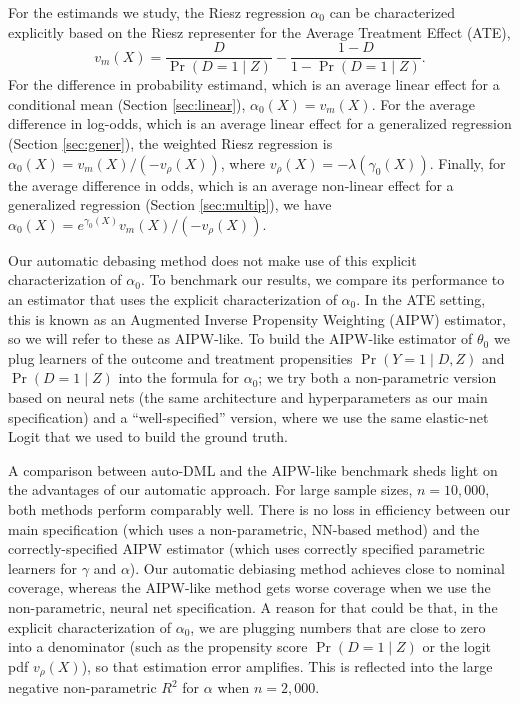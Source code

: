 \documentclass[aos]{imsart}
\numberwithin{equation}{section}
\theoremstyle{plain}
\theoremstyle{remark}
\begin{document}
For the estimands we study, the Riesz regression $\alpha_0$ can be characterized explicitly based on the Riesz representer for the Average Treatment Effect (ATE),
\[v_m(X) = \frac{D}{\Pr(D = 1 \mid Z)} - \frac{1-D}{1 - \Pr(D = 1 \mid Z)}.\]
For the difference in probability estimand, which is an average linear effect for a conditional mean (Section \ref{sec:linear}), $\alpha_0(X) = v_m(X)$. For the average difference in log-odds, which is an average linear effect for a generalized regression (Section \ref{sec:gener}), the weighted Riesz regression is $\alpha_0(X) = v_m(X)/(-v_\rho(X))$, where $v_\rho(X) = -\lambda(\gamma_0(X))$. Finally, for the average difference in odds, which is an average non-linear effect for a generalized regression (Section \ref{sec:multip}), we have $\alpha_0(X) = e^{\gamma_0(X)}v_m(X)/(-v_\rho(X))$. 

Our automatic debasing method does not make use of this explicit characterization of $\alpha_0$. To benchmark our results, we compare its performance to an estimator that uses the explicit characterization of $\alpha_0$. In the ATE setting, this is known as an Augmented Inverse Propensity Weighting (AIPW) estimator, so we will refer to these as AIPW-like. To build the AIPW-like estimator of $\theta_0$ we plug learners of the outcome and treatment propensities $\Pr(Y = 1 \mid D, Z)$ and $\Pr(D = 1 \mid Z)$ into the formula for $\alpha_0$; we try both a non-parametric version based on neural nets (the same architecture and hyperparameters as our main specification) and a ``well-specified'' version, where we use the same elastic-net Logit that we used to build the ground truth.

A comparison between auto-DML and the AIPW-like benchmark sheds light on the advantages of our automatic approach. For large sample sizes, $n = 10,000$, both methods perform comparably well. There is no loss in efficiency between our main specification (which uses a non-parametric, NN-based method) and the correctly-specified AIPW estimator (which uses correctly specified parametric learners for $\gamma$ and $\alpha$). Our automatic debiasing method achieves close to nominal coverage, whereas the AIPW-like method gets worse coverage when we use the non-parametric, neural net specification. A reason for that could be that, in the explicit characterization of $\alpha_0$, we are plugging numbers that are close to zero into a denominator (such as the propensity score $\Pr(D = 1 \mid Z)$ or the logit pdf $v_\rho(X)$), so that estimation error amplifies. This is reflected into the large negative non-parametric $R^2$ for $\alpha$ when $n = 2,000$. 
\end{document}
